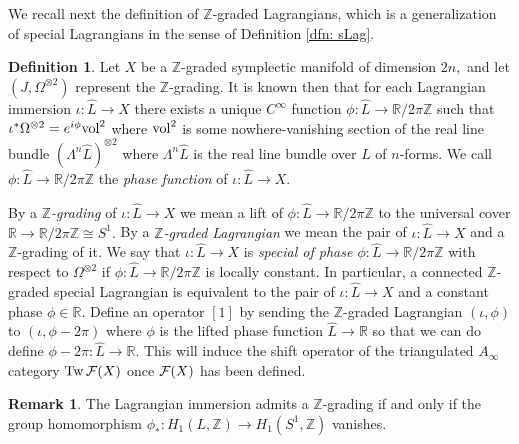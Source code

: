 \documentclass{article}
\DeclareMathOperator{\Tw}{Tw}
\theoremstyle{plain}%
\theoremstyle{definition}
\newtheorem{dfn}[thm]{Definition}
\newtheorem{rem}[thm]{Remark}
\numberwithin{equation}{section}
\numberwithin{figure}{section}
\def\l{\label}
\def\cF{{\mathbin{\cal F}}}
\def\R{{\mathbin{\mathbb R}}}
\def\Z{{\mathbin{\mathbb Z}}}
\def\io{\iota}
\def\ph{\phi}
\def\La{\Lambda}
\def\Om{\Omega}
\def\ot{\otimes}
\def\iy{\infty}
\begin{document}
We recall next the definition of $\Z$-graded Lagrangians, which is a generalization of special Lagrangians in the sense of Definition \ref{dfn: sLag}.
\begin{dfn}\l{dfn:Lag Z-grading}
Let $X$ be a $\Z$-graded symplectic manifold of dimension $2n,$ and let $(J,\Om^{\otimes2})$ represent the $\Z$-grading. It is known then that for each Lagrangian immersion $\io:\hat L\to X$ there exists a unique $C^\iy$ function $\ph:\hat L\to \R/2\pi\Z$ such that $\io^*\Om^{\ot2}=e^{i\ph}{\rm vol}^2$ where ${\rm vol}^2$ is some nowhere-vanishing section of the real line bundle $(\La^n\hat L)^{\otimes2}$ where $\La^n\hat L$ is the real line bundle over $L$ of $n$-forms. We call $\ph:\hat L\to \R/2\pi\Z$ the {\it phase function} of $\io:\hat L\to X.$

By a {\it $\Z$-grading} of $\io:\hat L\to X$ we mean a lift of $\ph:\hat L\to \R/2\pi\Z$ to the universal cover $\R\to\R/2\pi\Z\cong S^1.$ By a {\it $\Z$-graded Lagrangian} we mean the pair of $\io:\hat L\to X$ and a $\Z$-grading of it. We say that $\io:\hat L\to X$ is {\it special of phase $\ph:\hat L\to \R/2\pi\Z$} with respect to $\Om^{\ot2}$ if $\ph:\hat L\to \R/2\pi\Z$ is locally constant. In particular, a connected $\Z$-graded special Lagrangian is equivalent to the pair of $\io:\hat L\to X$ and a constant phase $\ph\in\R.$ Define an operator $[1]$ by sending the $\Z$-graded Lagrangian $(\io,\ph)$ to $(\io,\ph-2\pi)$ where $\ph$ is the lifted phase function $\hat L\to\R$ so that we can do define $\ph-2\pi:\hat L\to\R.$ This will induce the shift operator of the triangulated $A_\iy$ category $\Tw\cF(X)$ once $\cF(X)$ has been defined. 
\end{dfn}
\begin{rem}\l{rem: Lag grading}
The Lagrangian immersion admits a $\Z$-grading if and only if the group homomorphism $\ph_*:H_1(L,\Z)\to H_1(S^1,\Z)$ vanishes.
\end{rem}
\end{document}
